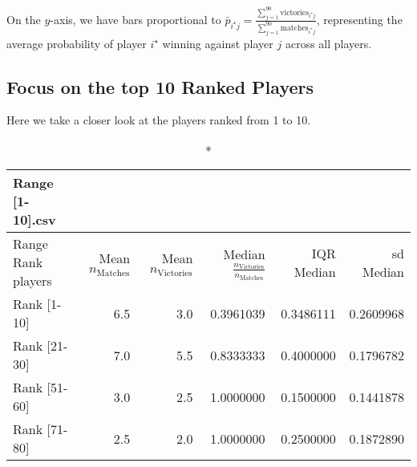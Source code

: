\documentclass[11pt]{amsart}
\begin{document}
On the $y$-axis, we have bars proportional to $\bar{p}_{i^\star j} = \frac{\sum_{j=1}^{90} \text{victories}_{i^\star j}}{\sum_{j=1}^{90}\text{matches}_{i^\star j}}$, representing the average probability of player $i^\star$ winning against player $j$ across all players.











\subsection{Focus on the top 10 Ranked Players}

Here we take a closer look at the players ranked from 1 to 10.

\begin{longtable}{lrrrrr}
\caption*{
{\large Range [1-10].csv}
} \\
\toprule
Range Rank players  & Mean $n_{\text{Matches}}$  & Mean $n_{\text{Victories}}$  & Median $\frac{n_{\text{Victories}}}{n_{\text{Matches}}}$ & IQR Median & sd Median\\
\midrule
Rank [1-10] & 6.5 & 3.0 & 0.3961039 & 0.3486111 & 0.2609968 \\
Rank [21-30] & 7.0 & 5.5 & 0.8333333 & 0.4000000 & 0.1796782 \\
Rank [51-60] & 3.0 & 2.5 & 1.0000000 & 0.1500000 & 0.1441878 \\
Rank [71-80] & 2.5 & 2.0 & 1.0000000 & 0.2500000 & 0.1872890 \\
\bottomrule
\end{longtable}

\begin{figure}
\centering
{}%
\label{ }%
\hfill
\\[2ex]
%
\label{ }
\end{figure}
\end{document}
